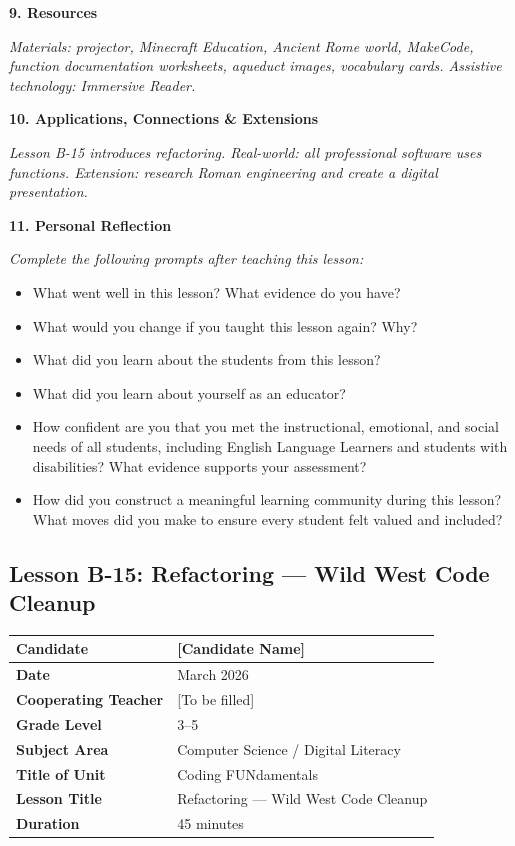 \documentclass[11pt,letterpaper]{article}
\begin{document}
\textbf{9. Resources}

\textit{Materials: projector, Minecraft Education, Ancient Rome world, MakeCode, function documentation worksheets, aqueduct images, vocabulary cards. Assistive technology: Immersive Reader.}

\textbf{10. Applications, Connections \& Extensions}

\textit{Lesson B-15 introduces refactoring. Real-world: all professional software uses functions. Extension: research Roman engineering and create a digital presentation.}

\textbf{11. Personal Reflection}

\textit{Complete the following prompts after teaching this lesson:}

\begin{itemize}
  \item What went well in this lesson? What evidence do you have?

  \item What would you change if you taught this lesson again? Why?

  \item What did you learn about the students from this lesson?

  \item What did you learn about yourself as an educator?

  \item How confident are you that you met the instructional, emotional, and social needs of all students, including English Language Learners and students with disabilities? What evidence supports your assessment?

  \item How did you construct a meaningful learning community during this lesson? What moves did you make to ensure every student felt valued and included?
\end{itemize}

\newpage
\subsection{Lesson B-15: Refactoring --- Wild West Code Cleanup}
\label{sub:LessonB15RefactoringWildWestCodeCleanup}

\begin{longtable}{|L{0.28\textwidth}|L{0.65\textwidth}|}
\hline
\textbf{Candidate}  & [Candidate Name]  \\
\hline
\textbf{Date}  & March 2026  \\
\hline
\textbf{Cooperating Teacher}  & [To be filled]  \\
\hline
\textbf{Grade Level}  & 3--5  \\
\hline
\textbf{Subject Area}  & Computer Science / Digital Literacy  \\
\hline
\textbf{Title of Unit}  & Coding FUNdamentals  \\
\hline
\textbf{Lesson Title}  & Refactoring --- Wild West Code Cleanup  \\
\hline
\textbf{Duration}  & 45 minutes  \\
\hline
\end{longtable}
\end{document}
